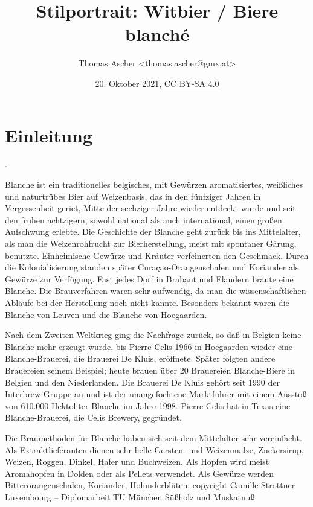 \documentclass[a4paper,parskip=half]{scrartcl}
\title{Stilportrait: Witbier / Biere blanché}
\author{Thomas Ascher <thomas.ascher@gmx.at>}
\date{20. Oktober 2021, \href{http://creativecommons.org/licenses/by-sa/4.0/}{CC BY-SA 4.0}}
\begin{document}
\maketitle

\section*{Einleitung}

\parencite[102]{Roncoroni2018}.
\parencite[290]{Dornbusch2019}
\parencite{Brueckelmeier2018}


\parencite[1]{Strottner1999}

Blanche ist ein traditionelles belgisches, mit Gewürzen aromatisiertes, weißliches
und naturtrübes Bier auf Weizenbasis, das in den fünfziger Jahren in Vergessenheit
geriet, Mitte der sechziger Jahre wieder entdeckt wurde und seit den frühen
achtzigern, sowohl national als auch international, einen großen Aufschwung erlebte.
Die Geschichte der Blanche geht zurück bis ins Mittelalter, als man die
Weizenrohfrucht zur Bierherstellung, meist mit spontaner Gärung, benutzte.
Einheimische Gewürze und Kräuter verfeinerten den Geschmack. Durch die
Kolonialisierung standen später Curaçao-Orangenschalen und Koriander als
Gewürze zur Verfügung. Fast jedes Dorf in Brabant und Flandern braute eine
Blanche. Die Brauverfahren waren sehr aufwendig, da man die wissenschaftlichen
Abläufe bei der Herstellung noch nicht kannte. Besonders bekannt waren die
Blanche von Leuven und die Blanche von Hoegaarden.

Nach dem Zweiten Weltkrieg ging die Nachfrage zurück, so daß in Belgien keine
Blanche mehr erzeugt wurde, bis Pierre Celis 1966 in Hoegaarden wieder eine
Blanche-Brauerei, die Brauerei De Kluis, eröffnete. Später folgten andere Brauereien
seinem Beispiel; heute brauen über 20 Brauereien Blanche-Biere in Belgien und den
Niederlanden. Die Brauerei De Kluis gehört seit 1990 der Interbrew-Gruppe an und
ist der unangefochtene Marktführer mit einem Ausstoß von 610.000 Hektoliter
Blanche im Jahre 1998. Pierre Celis hat in Texas eine Blanche-Brauerei, die Celis
Brewery, gegründet.

Die Braumethoden für Blanche haben sich seit dem Mittelalter sehr vereinfacht. Als
Extraktlieferanten dienen sehr helle Gersten- und Weizenmalze, Zuckersirup,
Weizen, Roggen, Dinkel, Hafer und Buchweizen. Als Hopfen wird meist
Aromahopfen in Dolden oder als Pellets verwendet. Als Gewürze werden
Bitterorangenschalen,
Koriander,
Holunderblüten,
copyright Camille Strottner Luxembourg – Diplomarbeit TU München
Süßholz
und
Muskatnuß
\end{document}
